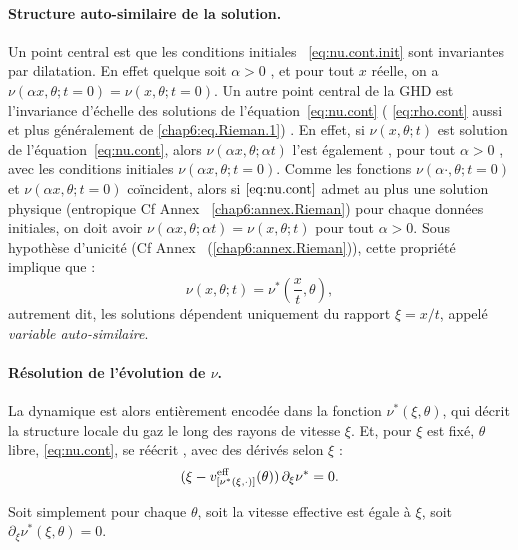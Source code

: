 \paragraph{Structure auto-similaire de la solution.}
Un point central est que les conditions initiales ~\eqref{eq:nu.cont.init} sont invariantes par dilatation. En effet quelque soit $\alpha >0$ , et pour tout $x$ réelle, on a $\nu(\alpha x , \theta ; t = 0 ) = \nu( x , \theta ; t = 0 ) $.
Un autre point central de la GHD est l’invariance d’échelle des solutions de l’équation~\eqref{eq:nu.cont} ( \eqref{eq:rho.cont} aussi et plus généralement de \eqref{chap6:eq.Rieman.1}) . En effet, si $\nu(x,\theta;t)$ est solution de  l’équation~\eqref{eq:nu.cont}, alors $\nu(\alpha x, \theta; \alpha t)$ l’est également ,  pour tout $\alpha > 0$ , avec les conditions initiales $\nu(\alpha x , \theta ; t = 0 )$. {\color{blue} Comme les fonctions $\nu(\alpha \cdot , \theta ; t = 0 )$ et $\nu( \alpha x , \theta ; t = 0 )$ coïncident, alors si $\eqref{eq:nu.cont}$ admet au plus une solution physique (entropique Cf Annex ~\ref{chap6:annex.Rieman}) pour chaque données initiales, on doit avoir $\nu( \alpha x , \theta ; \alpha t ) = \nu(  x , \theta ;  t )$ pour tout $\alpha > 0 $}. Sous hypothèse d’unicité (Cf Annex ~(\ref{chap6:annex.Rieman})), cette propriété implique que :
\begin{equation}
    \nu(x,\theta;t) = \nu^*\left(\frac{x}{t},\theta\right),
    \label{eq:nuvsnuetoile}
\end{equation}
autrement dit, les solutions dépendent uniquement du rapport $\xi = x/t$, appelé \emph{variable auto-similaire}. 


\paragraph{Résolution de l'évolution de $\nu$.} La dynamique est alors entièrement encodée dans la fonction $\nu^*(\xi,\theta)$, qui décrit la structure locale du gaz le long des rayons de vitesse $\xi$. Et,  pour $\xi$ est fixé, $\theta$  libre, \eqref{eq:nu.cont},  se réécrit  , avec des dérivés selon $\xi$ : 
\begin{equation}
	( \xi - v^{\rm eff}_{[\nu^\ast(\xi,\cdot )  ]}(\theta) )\, \partial_\xi \nu^\ast  = 0 .	
\end{equation}

Soit simplement pour chaque $\theta$, soit la vitesse effective est égale à $\xi$, soit $\partial_\xi \nu^\ast(\xi,\theta) = 0$.


